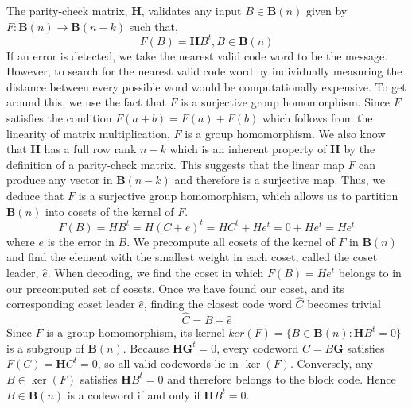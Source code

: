 \documentclass{article}
\begin{document}
The parity-check matrix, \(\mathbf{H}\), validates any input \(B \in \mathbf{B}(n)\) given by
\(F: \mathbf{B}(n) \rightarrow \mathbf{B}(n - k)\) such that,
\[
    F(B) = \mathbf{H}B^t, B \in \mathbf{B}(n)
\]
If an error is detected, we take the nearest valid code word to be the message. However, to search 
for the nearest valid code word by individually measuring the distance between every possible word 
would be computationally expensive. To get around this, we use the fact that \(F\) is a surjective
group homomorphism. Since \(F\) satisfies the condition \(F(a + b) = F(a) + F(b)\) which follows from the 
linearity of matrix multiplication, \(F\) is a group homomorphism. We also know that \(\mathbf{H}\) has a 
full row rank \(n - k\) which is an inherent property of \(\mathbf{H}\) by the definition of a parity-check
matrix. This suggests that the linear map \(F\) can produce any vector in \(\mathbf{B}(n - k)\) and 
therefore is a surjective map. Thus, we deduce that \(F\) is a surjective group homomorphism, which allows 
us to partition \(\mathbf{B}(n)\) into cosets of the kernel of \(F\).
\[
F(B) = HB^t = H(C + e)^t = HC^t + He^t = 0 + He^t = He^t
\]
where \(e\) is the error in \(B\). We precompute all cosets of the kernel of \(F\) in \(\mathbf{B}(n)\) and 
find the element with the smallest weight in each coset, called the coset leader, \(\hat{e}\). When 
decoding, we find the coset in which \(F(B) = He^t\) belongs to in our precomputed set of cosets. Once 
we have found our coset, and its corresponding coset leader \(\hat{e}\), finding the closest 
code word \(\hat{C}\) becomes trivial
\[
    \hat{C} = B + \hat{e}
\]
Since \(F\) is a group homomorphism, its kernel \(ker(F) = \{B \in \mathbf{B}(n):\mathbf{H}B^t = 0\}\) is
a subgroup of \(\mathbf{B}(n)\). Because \(\mathbf{HG}^t = 0\), every codeword \(C = B\mathbf{G}\) satisfies 
\(F(C) = \mathbf{H}C^t = 0\), so all valid codewords lie in \(\ker(F)\). Conversely, any \(B \in \ker(F)\) 
satisfies \(\mathbf{H}B^t = 0\) and therefore belongs to the block code. Hence \(B \in \mathbf{B}(n)\) is a 
codeword if and only if \(\mathbf{H}B^t = 0\).
\end{document}
